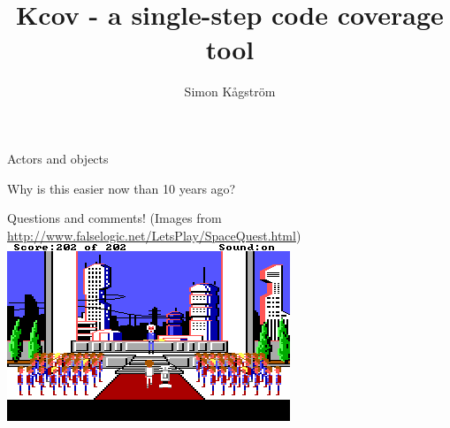 \documentclass{beamer}
\title[Kcov - a single-step code coverage tool] %
{Kcov - a single-step code coverage tool}
\author{Simon Kågström}
\institute
{
  Consultant\\
  \texttt{https://github.com/SimonKagstrom/emilpro}
}
\begin{document}
\begin{frame}
  \titlepage
\end{frame}

\begin{frame}
  \frametitle{Motivation}

  \note<2>{

\end{frame}


\begin{frame}{Actors and objects}
    \end{frame}

\begin{frame}{Why is this easier now than 10 years ago?}
\end{frame}

\begin{frame}{Questions and comments!}
  \footnotesize
  (Images from \url{http://www.falselogic.net/LetsPlay/SpaceQuest.html})
  \includegraphics[width=\linewidth]{sq_final}
\end{frame}
\end{document}
